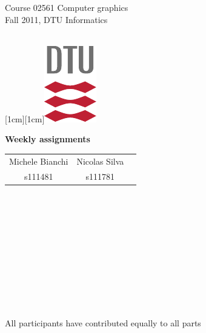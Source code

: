 \documentclass[9pt,a4paper]{scrreprt}
\begin{document}
\AddToShipoutPicture{\BackgroundPic}

\noindent\parbox[t]{9cm}{\textsf{Course 02561 Computer graphics\\
Fall 2011, DTU Informatics }}
\hfill
\parbox[t]{1cm}{\mbox{}\\
\raisebox{0.0cm}[1cm][1cm]{\includegraphics[origin=lb]{dtu_logo_cmyk.pdf}}}

\vspace{2cm}


\begin{center}
{\Large \bf Weekly assignments}\\
\vspace{0.3cm}
\vspace{1cm}
\vspace{0.3cm}
\begin{tabular}{ccc}
{\large Michele Bianchi}&{\large Nicolas Silva}\\
s111481&s111781
\end{tabular}\\
\end{center}
~\\~\\~\\~\\~\\~\\~\\~\\
\begin{center}
All participants have contributed equally to all parts
\end{center}
\newpage



\newpage

\newpage

\newpage

\newpage

\newpage

\newpage

\newpage

\newpage
%
\end{document}

